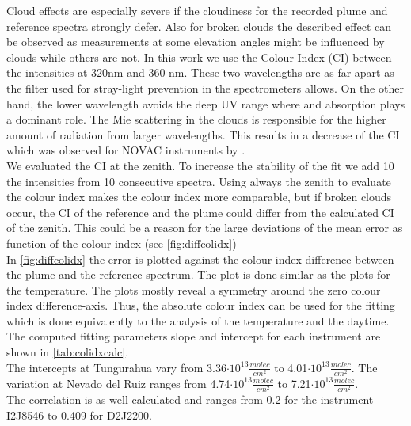 Cloud effects are especially severe if the cloudiness for the recorded plume and reference spectra strongly defer. Also for broken clouds the described effect can be observed as measurements at some elevation angles might be influenced by clouds while others are not.
In this work we use the Colour Index (CI) between the intensities at 320nm and 360 nm.
These two wavelengths are as far apart as the filter used for stray-light prevention in the spectrometers allows.
On the other hand, the lower wavelength avoids the deep UV range where  and   absorption plays a dominant role.
The Mie scattering in the clouds is responsible for the higher amount of radiation from larger wavelengths. This results in a decrease of the CI which was observed for NOVAC instruments by \citet{lubcke2014optical}.\\
We evaluated the CI at the zenith. To increase the stability of the fit we add 10 the intensities from 10 consecutive spectra. Using always the zenith to evaluate the colour index makes the colour index more comparable, but if broken clouds occur, the CI of the reference and the plume could differ from the calculated CI of the zenith. This could be a reason for the large deviations of the mean  error as function of the colour index (see \cref{fig:diffcolidx})\\
In \cref{fig:diffcolidx} the  error is plotted against the colour index difference between the plume and the reference spectrum. The plot is done similar as the plots for the temperature.
The plots mostly reveal a symmetry around the zero colour index difference-axis. Thus, the absolute colour index can be used for the fitting which is done equivalently to the analysis of the temperature and the daytime. The computed fitting parameters slope and intercept for each instrument are shown in \cref{tab:colidxcalc}. \\
The intercepts at Tungurahua vary from 3.36$\cdot10^{13}\frac{molec}{cm^2}$ to 4.01$\cdot10^{13}\frac{molec}{cm^2}$. The variation at Nevado del Ruiz ranges from  4.74$\cdot10^{13}\frac{molec}{cm^2}$ to 7.21$\cdot10^{13}\frac{molec}{cm^2}$.\\
The correlation is as well calculated and ranges from 0.2 for the instrument I2J8546 to  0.409 for D2J2200.\\
